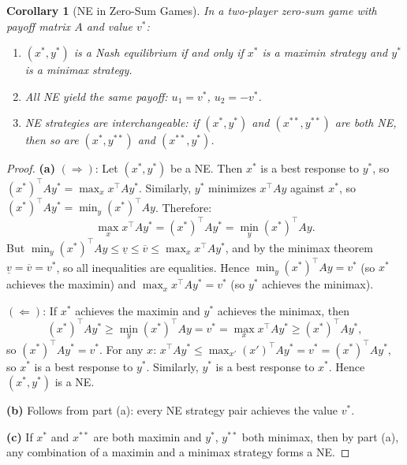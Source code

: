 \documentclass[11pt,a4paper]{article}
\theoremstyle{definition}
\theoremstyle{plain}
\newtheorem{corollary}[theorem]{Corollary}
\theoremstyle{remark}
\begin{document}
\begin{corollary}[NE in Zero-Sum Games]
\label{cor:ne_zero_sum}
In a two-player zero-sum game with payoff matrix $A$ and value $v^*$:
\begin{enumerate}[nosep,label=(\alph*)]
    \item $(x^*, y^*)$ is a Nash equilibrium if and only if $x^*$ is a maximin
    strategy and $y^*$ is a minimax strategy.
    \item All NE yield the same payoff: $u_1 = v^*$, $u_2 = -v^*$.
    \item NE strategies are interchangeable: if $(x^*, y^*)$ and $(x^{**}, y^{**})$
    are both NE, then so are $(x^*, y^{**})$ and $(x^{**}, y^*)$.
\end{enumerate}
\end{corollary}

\begin{proof}
\textbf{(a)} $(\Rightarrow)$: Let $(x^*, y^*)$ be a NE. Then $x^*$ is a best response
to $y^*$, so $(x^*)^\top A y^* = \max_x x^\top A y^*$. Similarly, $y^*$ minimizes
$x^\top A y$ against $x^*$, so $(x^*)^\top A y^* = \min_y (x^*)^\top A y$. Therefore:
\[
    \max_x x^\top A y^* = (x^*)^\top A y^* = \min_y (x^*)^\top A y.
\]
But $\min_y (x^*)^\top A y \leq \underline{v} \leq \overline{v}
\leq \max_x x^\top A y^*$,
and by the minimax theorem $\underline{v} = \overline{v} = v^*$, so all inequalities
are equalities. Hence $\min_y (x^*)^\top A y = v^*$ (so $x^*$ achieves the maximin)
and $\max_x x^\top A y^* = v^*$ (so $y^*$ achieves the minimax).

$(\Leftarrow)$: If $x^*$ achieves the maximin and $y^*$ achieves the minimax, then
\[
    (x^*)^\top A y^* \geq \min_y (x^*)^\top A y = v^*
    = \max_x x^\top A y^* \geq (x^*)^\top A y^*,
\]
so $(x^*)^\top A y^* = v^*$. For any $x$: $x^\top A y^* \leq \max_{x'} (x')^\top A y^*
= v^* = (x^*)^\top A y^*$, so $x^*$ is a best response to $y^*$. Similarly, $y^*$
is a best response to $x^*$. Hence $(x^*, y^*)$ is a NE.

\textbf{(b)} Follows from part (a): every NE strategy pair achieves the value $v^*$.

\textbf{(c)} If $x^*$ and $x^{**}$ are both maximin and $y^*$, $y^{**}$ both minimax,
then by part (a), any combination of a maximin and a minimax strategy forms a NE.
\end{proof}
\end{document}
